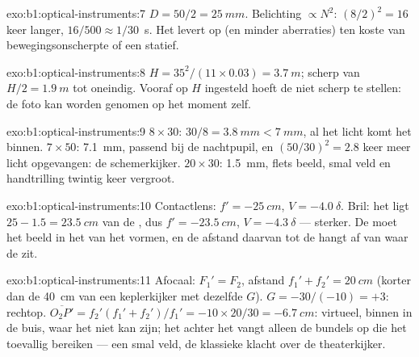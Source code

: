 \begin{solution}{exo:b1:optical-instruments:7}
$D = 50/2 = \qty{25}{mm}$. Belichting $\propto N^2$: $(8/2)^2 = 16$ keer
langer, $16/500 \approx 1/30$~\unit{s}. Het levert  op (en
minder aberraties) ten koste van bewegingsonscherpte of een statief.
\end{solution}

\begin{solution}{exo:b1:optical-instruments:8}
$H = 35^2/(11 \times 0.03) = \qty{3.7}{m}$; scherp van $H/2 =
\qty{1.9}{m}$ tot oneindig. Vooraf op $H$ ingesteld hoeft de  niet
scherp te stellen: de foto kan worden genomen op het moment zelf.
\end{solution}

\begin{solution}{exo:b1:optical-instruments:9}
$8\times30$:  $30/8 = \qty{3.8}{mm} < \qty{7}{mm}$, al het licht
komt het  binnen. $7\times50$: \qty{7.1}{mm}, passend bij de nachtpupil,
en $(50/30)^2 = 2.8$ keer meer licht opgevangen: de schemerkijker.
$20\times30$:  \qty{1.5}{mm}, flets beeld, smal veld en
handtrilling twintig keer vergroot.
\end{solution}

\begin{solution}{exo:b1:optical-instruments:10}
Contactlens: $f' = \qty{-25}{cm}$, $V = \qty{-4.0}{\delta}$. Bril:
het  ligt $25 - 1.5 = \qty{23.5}{cm}$ van de , dus $f' =
\qty{-23.5}{cm}$, $V = \qty{-4.3}{\delta}$ --- sterker. De  moet het
beeld in het  van het  vormen, en de afstand daarvan tot de 
hangt af van waar de  zit.
\end{solution}

\begin{solution}{exo:b1:optical-instruments:11}
Afocaal: $F_1' = F_2$, afstand $f_1' + f_2' = \qty{20}{cm}$ (korter
dan de \qty{40}{cm} van een keplerkijker met dezelfde $G$). $G = -30/(-10) =
+3$: rechtop.  $\overline{O_2P'} = f_2'(f_1' + f_2')/f_1' =
-10 \times 20/30 = \qty{-6.7}{cm}$: virtueel, binnen in de buis, waar het
 niet kan zijn; het  achter het  vangt alleen de bundels op die
het toevallig bereiken --- een smal veld, de klassieke klacht over de
theaterkijker.
\end{solution}

